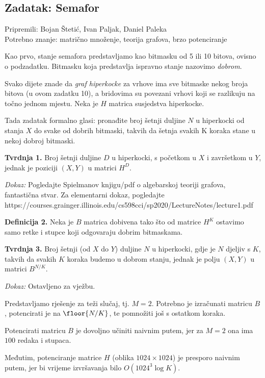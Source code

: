 \subsection*{Zadatak: Semafor}
\textsf{Pripremili: Bojan Štetić, Ivan Paljak, Daniel Paleka}\\
\textsf{Potrebno znanje: matrično množenje, teorija grafova, brzo potenciranje}

Kao prvo, stanje semafora predstavljamo kao bitmasku od 5 ili 10 bitova, ovisno
o podzadatku. Bitmasku koja predstavlja ispravno stanje nazovimo
\emph{dobrom}.

Svako dijete znade da \emph{graf hiperkocke} za vrhove ima sve bitmaske nekog
broja bitova (u ovom zadatku 10), a bridovima su povezani vrhovi koji se
razlikuju na točno jednom mjestu. Neka je $H$ matrica susjedstva hiperkocke.

Tada zadatak formalno glasi: pronađite broj šetnji duljine $N$ u hiperkocki 
od stanja $X$ do svake od dobrih bitmaski, takvih da šetnja svakih K koraka
stane u nekoj dobroj bitmaski.

\textbf{Tvrdnja 1.} Broj šetnji duljine $D$ u hiperkocki, s početkom u $X$ 
i završetkom u $Y$, jednak je poziciji $(X, Y)$ u matrici $H^D$.

\textit{Dokaz:} Pogledajte Spielmanov knjigu/pdf o algebarskoj teoriji grafova,
fantastična stvar. Za elementarni dokaz, pogledajte
\\
{https://courses.grainger.illinois.edu/cs598cci/sp2020/LectureNotes/lecture1.pdf}

\textbf{Definicija 2.} Neka je $B$ matrica dobivena tako što od matrice $H^K$ 
ostavimo samo retke i stupce koji odgovaraju dobrim bitmaskama.

\textbf{Tvrdnja 3.} Broj šetnji (od $X$ do $Y$) duljine $N$ u hiperkocki, gdje je $N$ djeljiv
s $K$, takvih da svakih $K$ koraka budemo u dobrom stanju, jednak je 
polju $(X, Y)$ u matrici $B^{N/K}$.

\textit{Dokaz:} Ostavljeno za vježbu.


Predstavljamo rješenje za teži slučaj, tj. $M=2$. 
Potrebno je izračunati matricu $B$, potencirati je na $\floor{N/K}$, te
pomnožiti još s ostatkom koraka.

Potencirati matricu $B$ je dovoljno učiniti naivnim putem,
jer za $M=2$ ona ima $100$ redaka i stupaca.

Međutim, potenciranje matrice $H$ (oblika $1024 \times 1024$) je presporo
naivnim putem, jer bi vrijeme izvršavanja bilo $O(1024^3 \log K)$.

